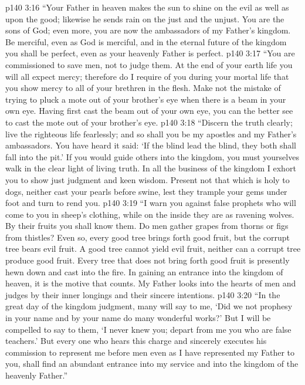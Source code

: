 \vs p140 3:16 \textcolor{ubdarkred}{“Your Father in heaven makes the sun to shine on the evil as well as upon the good; likewise he sends rain on the just and the unjust. You are the sons of God; even more, you are now the ambassadors of my Father’s kingdom. Be merciful, even as God is merciful, and in the eternal future of the kingdom you shall be perfect, even as your heavenly Father is perfect.}
\vs p140 3:17 \textcolor{ubdarkred}{“You are commissioned to save men, not to judge them. At the end of your earth life you will all expect mercy; therefore do I require of you during your mortal life that you show mercy to all of your brethren in the flesh. Make not the mistake of trying to pluck a mote out of your brother’s eye when there is a beam in your own eye. Having first cast the beam out of your own eye, you can the better see to cast the mote out of your brother’s eye.}
\vs p140 3:18 \textcolor{ubdarkred}{“Discern the truth clearly; live the righteous life fearlessly; and so shall you be my apostles and my Father’s ambassadors. You have heard it said: ‘If the blind lead the blind, they both shall fall into the pit.’ If you would guide others into the kingdom, you must yourselves walk in the clear light of living truth. In all the business of the kingdom I exhort you to show just judgment and keen wisdom. Present not that which is holy to dogs, neither cast your pearls before swine, lest they trample your gems under foot and turn to rend you.}
\vs p140 3:19 \textcolor{ubdarkred}{“I warn you against false prophets who will come to you in sheep’s clothing, while on the inside they are as ravening wolves. By their fruits you shall know them. Do men gather grapes from thorns or figs from thistles? Even so, every good tree brings forth good fruit, but the corrupt tree bears evil fruit. A good tree cannot yield evil fruit, neither can a corrupt tree produce good fruit. Every tree that does not bring forth good fruit is presently hewn down and cast into the fire. In gaining an entrance into the kingdom of heaven, it is the motive that counts. My Father looks into the hearts of men and judges by their inner longings and their sincere intentions.}
\vs p140 3:20 \textcolor{ubdarkred}{“In the great day of the kingdom judgment, many will say to me, ‘Did we not prophesy in your name and by your name do many wonderful works?’ But I will be compelled to say to them, ‘I never knew you; depart from me you who are false teachers.’ But every one who hears this charge and sincerely executes his commission to represent me before men even as I have represented my Father to you, shall find an abundant entrance into my service and into the kingdom of the heavenly Father.”}
